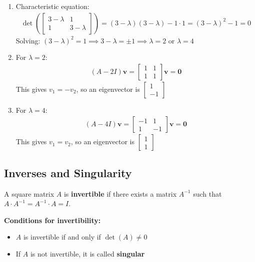\documentclass{article}
\begin{document}
\begin{enumerate}
    \item Characteristic equation:
    \begin{align}
    \det\left(\begin{bmatrix} 3-\lambda & 1 \\ 1 & 3-\lambda \end{bmatrix}\right) = (3-\lambda)(3-\lambda) - 1 \cdot 1 = (3-\lambda)^2 - 1 = 0
    \end{align}
    Solving: $(3-\lambda)^2 = 1 \implies 3-\lambda = \pm 1 \implies \lambda = 2$ or $\lambda = 4$

    \item For $\lambda = 2$:
    \begin{align}
    (A - 2I)\mathbf{v} = \begin{bmatrix} 1 & 1 \\ 1 & 1 \end{bmatrix}\mathbf{v} = \mathbf{0}
    \end{align}
    This gives $v_1 = -v_2$, so an eigenvector is $\begin{bmatrix} 1 \\ -1 \end{bmatrix}$

    \item For $\lambda = 4$:
    \begin{align}
    (A - 4I)\mathbf{v} = \begin{bmatrix} -1 & 1 \\ 1 & -1 \end{bmatrix}\mathbf{v} = \mathbf{0}
    \end{align}
    This gives $v_1 = v_2$, so an eigenvector is $\begin{bmatrix} 1 \\ 1 \end{bmatrix}$
\end{enumerate}

\subsection{Inverses and Singularity}

A square matrix $A$ is \textbf{invertible} if there exists a matrix $A^{-1}$ such that $A \cdot A^{-1} = A^{-1} \cdot A = I$.

\textbf{Conditions for invertibility:}
\begin{itemize}
    \item $A$ is invertible if and only if $\det(A) \neq 0$
    \item If $A$ is not invertible, it is called \textbf{singular}
\end{itemize}
\end{document}
